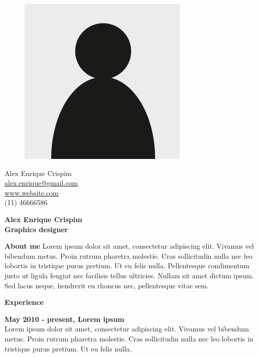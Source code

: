 \documentclass[a4paper,12pt,final]{memoir}
\newcommand{\Sep}{\vspace{1.5em}}
\newcommand{\SmallSep}{\vspace{0.5em}}
\newenvironment{AboutMe}
	{\ignorespaces\textbf{\color{RoyalBlue} About me}}
	{\Sep\ignorespacesafterend}
\newcommand{\CVSection}[1]
	{\Large\textbf{#1}\par
	\SmallSep\normalsize\normalfont}
\newcommand{\CVItem}[1]
	{\textbf{\color{RoyalBlue} #1}}
\begin{document}
\begin{figure}
	\hfill
	\includegraphics[width=0.6\columnwidth]{cv-photo.png}
	\vspace{-7cm}
\end{figure}

\begin{flushright}\small
	Alex Enrique Crispim\\ 
	\url{alex.enrique@gmail.com}  \\ 
	\url{www.website.com} \\ 
	(11) 46666586
\end{flushright}\normalsize
\framebreak



\Huge\bfseries {\color{RoyalBlue} Alex Enrique Crispim} \\ 
\Large\bfseries  Graphics designer \\ 

\normalsize\normalfont

\begin{AboutMe}
Lorem ipsum dolor sit amet, consectetur adipiscing elit. Vivamus vel bibendum metus. Proin rutrum pharetra molestie. Cras sollicitudin nulla nec leo lobortis in tristique purus pretium. Ut eu felis nulla. Pellentesque condimentum justo ut ligula feugiat nec facilisis tellus ultricies. Nullam sit amet dictum ipsum. Sed lacus neque, hendrerit eu rhoncus nec, pellentesque vitae sem.
\end{AboutMe}

\CVSection{Experience}
\CVItem{May 2010 - present, Lorem ipsum} \\ 
Lorem ipsum dolor sit amet, consectetur adipiscing elit. Vivamus vel bibendum metus. Proin rutrum pharetra molestie. Cras sollicitudin nulla nec leo lobortis in tristique purus pretium. Ut eu felis nulla.
\SmallSep
\end{document}
